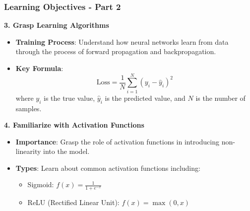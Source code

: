 \documentclass{beamer}
\begin{document}
\begin{frame}[fragile]
    \frametitle{Learning Objectives - Part 2}
    \textbf{3. Grasp Learning Algorithms}
    \begin{itemize}
        \item \textbf{Training Process}: Understand how neural networks learn from data through the process of forward propagation and backpropagation.
        \item \textbf{Key Formula}:
        \begin{equation}
            \text{Loss} = \frac{1}{N} \sum_{i=1}^{N} (y_i - \hat{y}_i)^2
        \end{equation}
        where \( y_i \) is the true value, \( \hat{y}_i \) is the predicted value, and \( N \) is the number of samples.
    \end{itemize}

    \textbf{4. Familiarize with Activation Functions}
    \begin{itemize}
        \item \textbf{Importance}: Grasp the role of activation functions in introducing non-linearity into the model.
        \item \textbf{Types}: Learn about common activation functions including:
        \begin{itemize}
            \item Sigmoid: \( f(x) = \frac{1}{1 + e^{-x}} \)
            \item ReLU (Rectified Linear Unit): \( f(x) = \max(0, x) \)
        \end{itemize}
    \end{itemize}
\end{frame}
\end{document}
